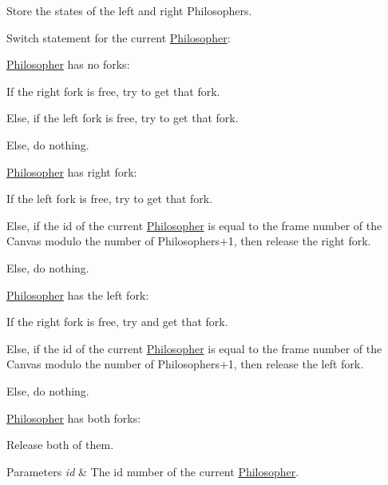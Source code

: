 \begin{DoxyItemize}
\item Store the states of the left and right Philosophers.
\item Switch statement for the current \hyperlink{class_philosopher}{Philosopher}\+:
\begin{DoxyItemize}
\item \hyperlink{class_philosopher}{Philosopher} has no forks\+:
\begin{DoxyItemize}
\item If the right fork is free, try to get that fork.
\item Else, if the left fork is free, try to get that fork.
\item Else, do nothing.
\end{DoxyItemize}
\item \hyperlink{class_philosopher}{Philosopher} has right fork\+:
\begin{DoxyItemize}
\item If the left fork is free, try to get that fork.
\item Else, if the id of the current \hyperlink{class_philosopher}{Philosopher} is equal to the frame number of the Canvas modulo the number of Philosophers+1, then release the right fork.
\item Else, do nothing.
\end{DoxyItemize}
\item \hyperlink{class_philosopher}{Philosopher} has the left fork\+:
\begin{DoxyItemize}
\item If the right fork is free, try and get that fork.
\item Else, if the id of the current \hyperlink{class_philosopher}{Philosopher} is equal to the frame number of the Canvas modulo the number of Philosophers+1, then release the left fork.
\item Else, do nothing.
\end{DoxyItemize}
\item \hyperlink{class_philosopher}{Philosopher} has both forks\+:
\begin{DoxyItemize}
\item Release both of them.
\end{DoxyItemize}
\end{DoxyItemize}
\end{DoxyItemize}
\begin{DoxyParams}{Parameters}
{\em id} & The id number of the current \hyperlink{class_philosopher}{Philosopher}. \\
\hline
\end{DoxyParams}


